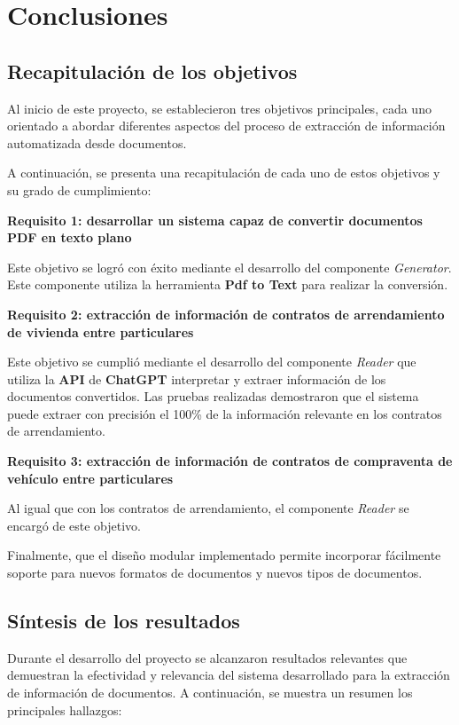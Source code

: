 \chapter{Conclusiones}\label{ch:chapter_6}


\section{Recapitulación de los objetivos}

Al inicio de este proyecto, se establecieron tres objetivos principales, cada uno orientado a abordar diferentes
aspectos del proceso de extracción de información automatizada desde documentos.

A continuación, se presenta una recapitulación de cada uno de estos objetivos y su grado de cumplimiento:

\textbf{Requisito 1: desarrollar un sistema capaz de convertir documentos PDF en texto plano}

Este objetivo se logró con éxito mediante el desarrollo del componente \textit{Generator}.
Este componente utiliza la herramienta \textbf{Pdf to Text} para realizar la conversión.

\textbf{Requisito 2: extracción de información de contratos de arrendamiento de vivienda entre particulares}

Este objetivo se cumplió mediante el desarrollo del componente \textit{Reader} que utiliza la \textbf{API}
de \textbf{ChatGPT} interpretar y extraer información de los documentos convertidos.
Las pruebas realizadas demostraron que el sistema puede extraer con precisión el 100\% de la información relevante
en los contratos de arrendamiento.

\textbf{Requisito 3: extracción de información de contratos de compraventa de vehículo entre particulares}

Al igual que con los contratos de arrendamiento, el componente \textit{Reader} se encargó de este objetivo.

Finalmente, que el diseño modular implementado permite incorporar fácilmente soporte para nuevos formatos de
documentos y nuevos tipos de documentos.


\section{Síntesis de los resultados}

Durante el desarrollo del proyecto se alcanzaron resultados relevantes que demuestran la efectividad y relevancia del
sistema desarrollado para la extracción de información de documentos.
A continuación, se muestra un resumen los principales hallazgos:

